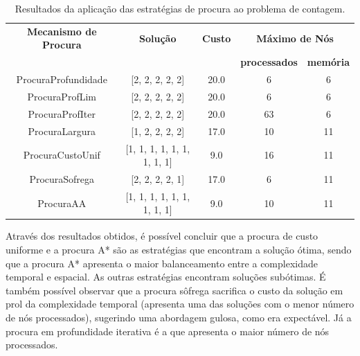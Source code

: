 \begin{table}[htbp]
    \centering
    \caption{Resultados da aplicação das estratégias de procura ao problema de contagem.}
    \label{tab:resultados-procura-contagem}
    \vspace{0.2cm}
    \begin{tabular}{|c|c|c|c|c|}
        \hline
        \textbf{Mecanismo de Procura} & \textbf{Solução} & \textbf{Custo} & \multicolumn{2}{c|}{\textbf{Máximo de Nós}} \\ \cline{4-5}
        &                             &      & \textbf{processados} & \textbf{memória} \\
        \hline
        ProcuraProfundidade & [2, 2, 2, 2, 2]             & 20.0 & 6                    & 6                \\
        \hline
        ProcuraProfLim      & [2, 2, 2, 2, 2]             & 20.0 & 6                    & 6                \\
        \hline
        ProcuraProfIter     & [2, 2, 2, 2, 2]             & 20.0 & 63                   & 6                \\
        \hline
        ProcuraLargura      & [1, 2, 2, 2, 2]             & 17.0 & 10                   & 11               \\
        \hline
        ProcuraCustoUnif    & [1, 1, 1, 1, 1, 1, 1, 1, 1] & 9.0  & 16                   & 11               \\
        \hline
        ProcuraSofrega      & [2, 2, 2, 2, 1]             & 17.0 & 6                    & 11               \\
        \hline
        ProcuraAA           & [1, 1, 1, 1, 1, 1, 1, 1, 1] & 9.0  & 10                   & 11               \\
        \hline
    \end{tabular}
\end{table}


Através dos resultados obtidos, é possível concluir que a procura de custo uniforme e a procura A* são as estratégias que encontram a solução ótima, sendo que a procura A* apresenta o maior balanceamento entre a complexidade temporal e espacial.
As outras estratégias encontram soluções subótimas.
É também possível observar que a procura sôfrega sacrifica o custo da solução em prol da complexidade temporal (apresenta uma das soluções com o menor número de nós processados), sugerindo uma abordagem gulosa, como era expectável.
Já a procura em profundidade iterativa é a que apresenta o maior número de nós processados.

